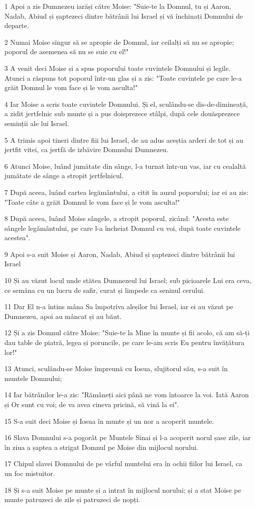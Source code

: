 \par 1 Apoi a zis Dumnezeu iarăși către Moise: "Suie-te la Domnul, tu și Aaron, Nadab, Abiud și șaptezeci dintre bătrânii lui Israel și vă închinați Domnului de departe.
\par 2 Numai Moise singur să se apropie de Domnul, iar ceilalți să nu se apropie; poporul de asemenea să nu se suie cu el!"
\par 3 A venit deci Moise și a spus poporului toate cuvintele Domnului și legile. Atunci a răspuns tot poporul într-un glas și a zis: "Toate cuvintele pe care le-a grăit Domnul le vom face și le vom asculta!"
\par 4 Iar Moise a scris toate cuvintele Domnului. Și el, sculându-se dis-de-dimineață, a zidit jertfelnic sub munte și a pus doisprezece stâlpi, după cele douăsprezece seminții ale lui Israel.
\par 5 A trimis apoi tineri dintre fiii lui Israel, de au adus aceștia arderi de tot și au jertfit vitei, ca jertfă de izbăvire Domnului Dumnezeu.
\par 6 Atunci Moise, luând jumătate din sânge, l-a turnat într-un vas, iar cu cealaltă jumătate de sânge a stropit jertfelnicul.
\par 7 După aceea, luând cartea legământului, a citit în auzul poporului; iar ei au zis: "Toate câte a grăit Domnul le vom face și le vom asculta!"
\par 8 După aceea, luând Moise sângele, a stropit poporul, zicând: "Acesta este sângele legământului, pe care l-a încheiat Domnul cu voi, după toate cuvintele acestea".
\par 9 Apoi s-a suit Moise și Aaron, Nadab, Abiud și șaptezeci dintre bătrânii lui Israel
\par 10 Și au văzut locul unde stătea Dumnezeul lui Israel; sub picioarele Lui era ceva, ce semăna cu un lucru de safir, curat și limpede ca seninul cerului.
\par 11 Dar El n-a întins mâna Sa împotriva aleșilor lui Israel, iar ei au văzut pe Dumnezeu, apoi au mâncat și au băut.
\par 12 Și a zis Domnul către Moise: "Suie-te la Mine în munte și fii acolo, că am să-ți dau table de piatră, legea și poruncile, pe care le-am scris Eu pentru învățătura lor!"
\par 13 Atunci, sculându-se Moise împreună cu Iosua, slujitorul său, s-a suit în muntele Domnului;
\par 14 Iar bătrânilor le-a zis: "Rămâneți aici până ne vom întoarce la voi. Iată Aaron și Or sunt cu voi; de va avea cineva pricină, să vină la ei".
\par 15 S-a suit deci Moise și Iosua în munte și un nor a acoperit muntele.
\par 16 Slava Domnului s-a pogorât pe Muntele Sinai și l-a acoperit norul șase zile, iar în ziua a șaptea a strigat Domnul pe Moise din mijlocul norului.
\par 17 Chipul slavei Domnului de pe vârful muntelui era în ochii fiilor lui Israel, ca un foc mistuitor.
\par 18 Și s-a suit Moise pe munte și a intrat în mijlocul norului; și a stat Moise pe munte patruzeci de zile și patruzeci de nopți.

